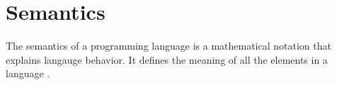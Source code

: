 \section{Semantics}
\label{sec:semantics}

The semantics of a programming language is a mathematical notation that explains langauge behavior. It defines the meaning of all the elements in a language \cite{misc:sem}.\\ \indent
